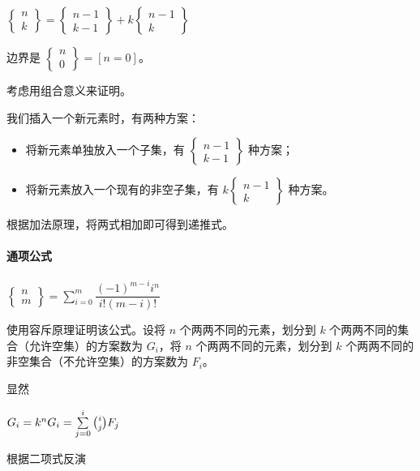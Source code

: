 \documentclass[]{article}
\providecommand{\tightlist}{%
  \setlength{\itemsep}{0pt}\setlength{\parskip}{0pt}}
\let\oldparagraph\paragraph
\renewcommand{\paragraph}[1]{\oldparagraph{#1}\mbox{}}
\begin{document}
\(\begin{Bmatrix}n\\ k\end{Bmatrix}=\begin{Bmatrix}n-1\\ k-1\end{Bmatrix}+k\begin{Bmatrix}n-1\\ k\end{Bmatrix}\)

边界是 \(\begin{Bmatrix}n\\ 0\end{Bmatrix}=[n=0]\)。

考虑用组合意义来证明。

我们插入一个新元素时，有两种方案：

\begin{itemize}
\tightlist
\item
  将新元素单独放入一个子集，有 \(\begin{Bmatrix}n-1\\ k-1\end{Bmatrix}\)
  种方案；
\item
  将新元素放入一个现有的非空子集，有
  \(k\begin{Bmatrix}n-1\\ k\end{Bmatrix}\) 种方案。
\end{itemize}

根据加法原理，将两式相加即可得到递推式。

\hypertarget{ux901aux9879ux516cux5f0f}{%
\paragraph{通项公式}\label{ux901aux9879ux516cux5f0f}}

\(\begin{Bmatrix}n\\m\end{Bmatrix}=\sum\limits_{i=0}^m\dfrac{(-1)^{m-i}i^n}{i!(m-i)!}\)

使用容斥原理证明该公式。设将 \(n\) 个两两不同的元素，划分到 \(k\)
个两两不同的集合（允许空集）的方案数为 \(G_i\)，将 \(n\)
个两两不同的元素，划分到 \(k\)
个两两不同的非空集合（不允许空集）的方案数为 \(F_i\)。

显然

\(G_i=k^n\\ G_i=\sum\limits_{j=0}^i\binom{i}{j}F_j\)

根据二项式反演
\end{document}
